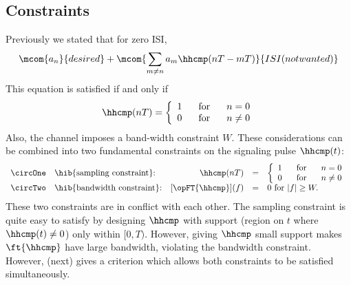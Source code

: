 \subsection{Constraints}
Previously we stated that for zero ISI,
  \[\mcom{a_n}{desired} + \mcom{\sum_{m\not=n} a_m \hhcmp(nT-mT)}{ISI (not wanted)}\]
This equation is satisfied if and only if
\[
   \hhcmp(nT) =
   \left\{\begin{array}{l@{\hspace{4ex}\mbox{for}\hspace{4ex}}l}
     1 &   n=    0 \\
     0 &   n\neq 0
   \end{array}\right.
\]
Also, the channel imposes a band-width constraint $W$.
These considerations can be combined into two fundamental constraints
on the signaling pulse $\hhcmp(t)$:
\[
\begin{array}{llrcl}
   \circOne & \text{\hib{sampling constraint}:}
      & \hhcmp(nT) &=&
          \left\{\begin{array}{l@{\hspace{4ex}\mbox{for}\hspace{4ex}}l}
            1 &   n=    0 \\
            0 &   n\neq 0
          \end{array}\right.
\\
   \circTwo & \text{\hib{bandwidth constraint}:}
      & [\opFT{\hhcmp}](f) &=& 0 \mbox{ for } |f|\ge W.
\end{array}
\]
These two constraints are in conflict with each other.
The sampling constraint is quite easy to satisfy by
designing $\hhcmp$ with support (region on $t$ where $\hhcmp(t)\neq0$)
only within $[0, T)$.
However, giving $\hhcmp$ small support makes $\ft{\hhcmp}$ have large
bandwidth, violating the bandwidth constraint.
However,  (next) gives a criterion which allows
both constraints to be satisfied simultaneously.


